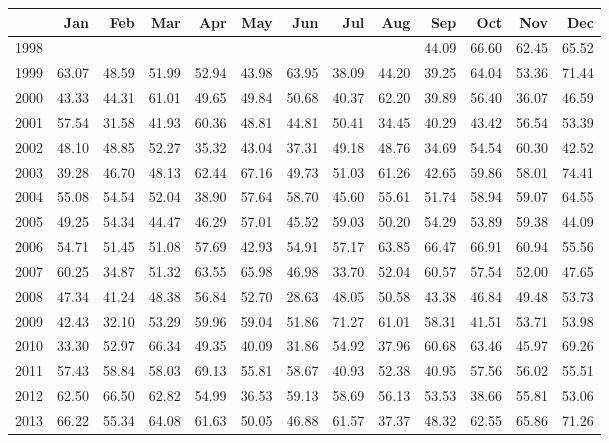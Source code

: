 \begin{longtable}{rrrrrrrrrrrrr}
  \hline
 & Jan & Feb & Mar & Apr & May & Jun & Jul & Aug & Sep & Oct & Nov & Dec \\ 
  \hline
1998 &  &  &  &  &  &  &  &  & 44.09 & 66.60 & 62.45 & 65.52 \\ 
  1999 & 63.07 & 48.59 & 51.99 & 52.94 & 43.98 & 63.95 & 38.09 & 44.20 & 39.25 & 64.04 & 53.36 & 71.44 \\ 
  2000 & 43.33 & 44.31 & 61.01 & 49.65 & 49.84 & 50.68 & 40.37 & 62.20 & 39.89 & 56.40 & 36.07 & 46.59 \\ 
  2001 & 57.54 & 31.58 & 41.93 & 60.36 & 48.81 & 44.81 & 50.41 & 34.45 & 40.29 & 43.42 & 56.54 & 53.39 \\ 
  2002 & 48.10 & 48.85 & 52.27 & 35.32 & 43.04 & 37.31 & 49.18 & 48.76 & 34.69 & 54.54 & 60.30 & 42.52 \\ 
  2003 & 39.28 & 46.70 & 48.13 & 62.44 & 67.16 & 49.73 & 51.03 & 61.26 & 42.65 & 59.86 & 58.01 & 74.41 \\ 
  2004 & 55.08 & 54.54 & 52.04 & 38.90 & 57.64 & 58.70 & 45.60 & 55.61 & 51.74 & 58.94 & 59.07 & 64.55 \\ 
  2005 & 49.25 & 54.34 & 44.47 & 46.29 & 57.01 & 45.52 & 59.03 & 50.20 & 54.29 & 53.89 & 59.38 & 44.09 \\ 
  2006 & 54.71 & 51.45 & 51.08 & 57.69 & 42.93 & 54.91 & 57.17 & 63.85 & 66.47 & 66.91 & 60.94 & 55.56 \\ 
  2007 & 60.25 & 34.87 & 51.32 & 63.55 & 65.98 & 46.98 & 33.70 & 52.04 & 60.57 & 57.54 & 52.00 & 47.65 \\ 
  2008 & 47.34 & 41.24 & 48.38 & 56.84 & 52.70 & 28.63 & 48.05 & 50.58 & 43.38 & 46.84 & 49.48 & 53.73 \\ 
  2009 & 42.43 & 32.10 & 53.29 & 59.96 & 59.04 & 51.86 & 71.27 & 61.01 & 58.31 & 41.51 & 53.71 & 53.98 \\ 
  2010 & 33.30 & 52.97 & 66.34 & 49.35 & 40.09 & 31.86 & 54.92 & 37.96 & 60.68 & 63.46 & 45.97 & 69.26 \\ 
  2011 & 57.43 & 58.84 & 58.03 & 69.13 & 55.81 & 58.67 & 40.93 & 52.38 & 40.95 & 57.56 & 56.02 & 55.51 \\ 
  2012 & 62.50 & 66.50 & 62.82 & 54.99 & 36.53 & 59.13 & 58.69 & 56.13 & 53.53 & 38.66 & 55.81 & 53.06 \\ 
  2013 & 66.22 & 55.34 & 64.08 & 61.63 & 50.05 & 46.88 & 61.57 & 37.37 & 48.32 & 62.55 & 65.86 & 71.26 \\ 

\end{longtable}
